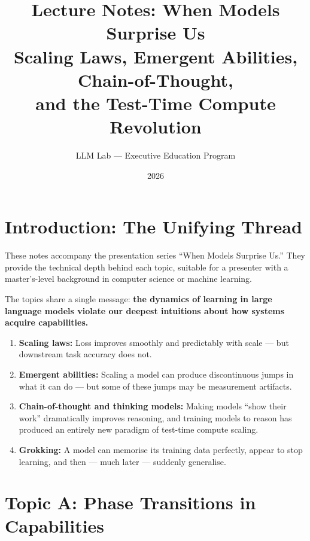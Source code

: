 \documentclass[11pt, a4paper]{article}
\title{\textbf{Lecture Notes: When Models Surprise Us}\\[0.3em]
  \large Scaling Laws, Emergent Abilities, Chain-of-Thought,\\and the Test-Time Compute Revolution}
\author{LLM Lab --- Executive Education Program}
\date{2026}
\theoremstyle{definition}
\theoremstyle{plain}
\begin{document}
\maketitle
\tableofcontents
\newpage

\section{Introduction: The Unifying Thread}

These notes accompany the presentation series ``When Models Surprise Us.'' They provide the technical depth behind each topic, suitable for a presenter with a master's-level background in computer science or machine learning.

The topics share a single message: \textbf{the dynamics of learning in large language models violate our deepest intuitions about how systems acquire capabilities.}

\begin{enumerate}
  \item \textbf{Scaling laws:} Loss improves smoothly and predictably with scale --- but downstream task accuracy does not.
  \item \textbf{Emergent abilities:} Scaling a model can produce discontinuous jumps in what it can do --- but some of these jumps may be measurement artifacts.
  \item \textbf{Chain-of-thought and thinking models:} Making models ``show their work'' dramatically improves reasoning, and training models to reason has produced an entirely new paradigm of test-time compute scaling.
  \item \textbf{Grokking:} A model can memorise its training data perfectly, appear to stop learning, and then --- much later --- suddenly generalise.
\end{enumerate}


\section{Topic A: Phase Transitions in Capabilities}
\label{sec:emergence}

\end{document}
